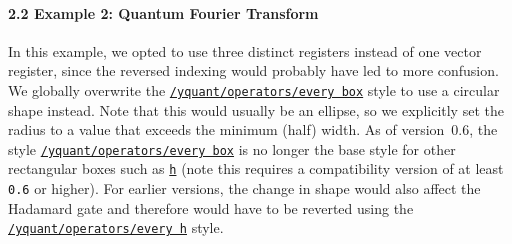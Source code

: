 \documentclass{scrartcl}
\makeatletter
\newenvironment{codeexample*}{%
   \VerbatimEnvironment%
   \let\FVB@VerbatimOut\minted@FVB@VerbatimOut
   \let\FVE@VerbatimOut\minted@FVE@VerbatimOut
   \minted@configlang{tex}%
   \minted@fvset
   \begin{VerbatimOut}[codes={\catcode`\^^I=12},firstline,lastline]{\minted@jobname.pyg}%
}{
   \end{VerbatimOut}%
   \minted@langlinenoson%
   \begin{adjustbox}{center}
       \minted@jobname.pyg %
   \end{adjustbox}\nopagebreak
   \expandafter\minted@pygmentize\expandafter{\minted@lang}%
   \minted@langlinenosoff%
   \par%
}
\def\gate#1{\hyperref[gate:#1]{\texttt{#1}}}
\def\style#1{\hyperref[style:#1]{\texttt{#1}}}
\makeatother
\begin{document}
            \paragraph{2.2 Example 2: Quantum Fourier Transform}\leavevmode
               \begin{example}
                  \begin{codeexample*}
                  \end{codeexample*}
                  In this example, we opted to use three distinct registers instead of one vector register, since the reversed indexing would probably have led to more confusion.
                  We globally overwrite the \style{/yquant/operators/every box} style to use a circular shape instead.
                  Note that this would usually be an ellipse, so we explicitly set the radius to a value that exceeds the minimum (half) width.
                  As of version~0.6, the style \style{/yquant/operators/every box} is no longer the base style for other rectangular boxes such as \gate{h} (note this requires a compatibility version of at least \texttt{0.6} or higher).
                  For earlier versions, the change in shape would also affect the Hadamard gate and therefore would have to be reverted using the \style{/yquant/operators/every h} style.
               \end{example}

            \clearpage
\end{document}
